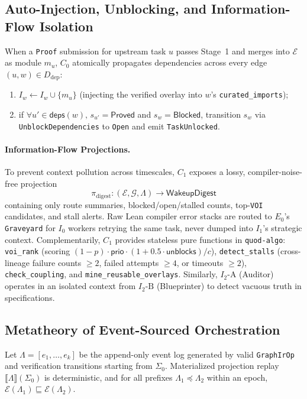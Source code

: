 \documentclass[sigplan,nonacm,10pt]{acmart}
\newcommand{\Truth}{\mathcal{E}}
\newcommand{\Orch}{\mathcal{G}}
\newcommand{\Events}{\Lambda}
\newcommand{\kw}[1]{\mathsf{#1}}
\newcommand{\code}[1]{\texttt{#1}}
\begin{document}
\subsection{Auto-Injection, Unblocking, and Information-Flow Isolation}
When a \code{Proof} submission for upstream task $u$ passes Stage~1 and merges into $\Truth$ as module $m_u$, $C_0$ atomically propagates dependencies across every edge $(u, w) \in D_{\mathrm{dep}}$:
\begin{enumerate}
  \item $I_w \leftarrow I_w \cup \{m_u\}$ (injecting the verified overlay into $w$'s \code{curated\_imports});
  \item if $\forall u' \in \kw{deps}(w),\, s_{u'} = \kw{Proved}$ and $s_w = \kw{Blocked}$, transition $s_w$ via \code{UnblockDependencies} to \code{Open} and emit \code{TaskUnlocked}.
\end{enumerate}

\paragraph{Information-Flow Projections.}
To prevent context pollution across timescales, $C_1$ exposes a lossy, compiler-noise-free projection
\[
\pi_{\mathrm{digest}} : (\Truth, \Orch, \Events) \to \kw{WakeupDigest}
\]
containing only route summaries, blocked/open/stalled counts, top-\code{VOI} candidates, and stall alerts. Raw Lean compiler error stacks are routed to $E_0$'s \code{Graveyard} for $I_0$ workers retrying the same task, never dumped into $I_1$'s strategic context. Complementarily, $C_1$ provides stateless pure functions in \code{quod-algo}: \code{voi\_rank} (scoring $(1-p)\cdot\kw{prio}\cdot(1+0.5\cdot\kw{unblocks})/c$), \code{detect\_stalls} (cross-lineage failure counts $\ge 2$, failed attempts $\ge 4$, or timeouts $\ge 2$), \code{check\_coupling}, and \code{mine\_reusable\_overlays}. Similarly, $I_2\text{-A}$ (Auditor) operates in an isolated context from $I_2\text{-B}$ (Blueprinter) to detect vacuous truth in specifications.

\subsection{Metatheory of Event-Sourced Orchestration}

\begin{theorem}\label{thm:replay}
Let $\Events = [e_1, \dots, e_k]$ be the append-only event log generated by valid \code{GraphIrOp} and verification transitions starting from $\Sigma_0$. Materialized projection replay $\llbracket \Events \rrbracket(\Sigma_0)$ is deterministic, and for all prefixes $\Events_1 \preceq \Events_2$ within an epoch, $\Truth(\Events_1) \sqsubseteq \Truth(\Events_2)$.
\end{theorem}
\end{document}
